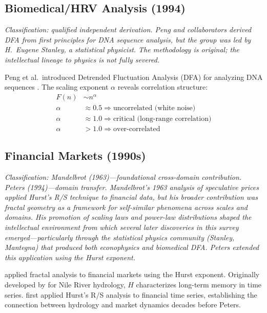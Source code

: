 \documentclass[11pt]{article}
\begin{document}
\subsection{Biomedical/HRV Analysis (1994)}
\label{sec:biomedical}

\noindent\textit{Classification: qualified independent derivation. Peng and collaborators derived DFA from first principles for DNA sequence analysis, but the group was led by H.\ Eugene Stanley, a statistical physicist. The methodology is original; the intellectual lineage to physics is not fully severed.}
\smallskip

Peng et al.\ introduced Detrended Fluctuation Analysis (DFA) for analyzing DNA sequences \citep{peng1994dna}. The scaling exponent $\alpha$ reveals correlation structure:
\begin{align}
F(n) &\sim n^\alpha \\
\alpha &\approx 0.5 \Longrightarrow \text{uncorrelated (white noise)} \\
\alpha &\approx 1.0 \Longrightarrow \text{critical (long-range correlation)} \\
\alpha &> 1.0 \Longrightarrow \text{over-correlated}
\end{align}

\subsection{Financial Markets (1990s)}

\noindent\textit{Classification: Mandelbrot (1963)---foundational cross-domain contribution. Peters (1994)---domain transfer. Mandelbrot's 1963 analysis of speculative prices applied Hurst's R/S technique to financial data, but his broader contribution was fractal geometry as a framework for self-similar phenomena across scales and domains. His promotion of scaling laws and power-law distributions shaped the intellectual environment from which several later discoveries in this survey emerged---particularly through the statistical physics community (Stanley, Mantegna) that produced both econophysics and biomedical DFA. Peters extended this application using the Hurst exponent.}
\smallskip

\citet{peters1994} applied fractal analysis to financial markets using the Hurst exponent. Originally developed by \citet{hurst1951} for Nile River hydrology, $H$ characterizes long-term memory in time series. \citet{mandelbrot1963} first applied Hurst's R/S analysis to financial time series, establishing the connection between hydrology and market dynamics decades before Peters.
\end{document}

